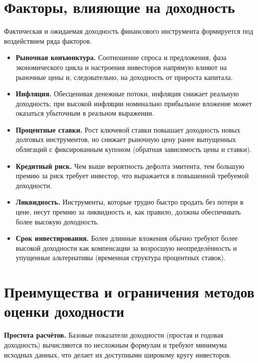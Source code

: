 \documentclass[14pt, a4paper]{extarticle}
\begin{document}
\section{Факторы, влияющие на доходность}

Фактическая и ожидаемая доходность финансового инструмента формируется под
воздействием ряда факторов.

\begin{itemize}
  \item \textbf{Рыночная конъюнктура.} Соотношение спроса и предложения,
        фаза экономического цикла и настроения инвесторов напрямую влияют на
        рыночные цены и, следовательно, на доходность от прироста капитала.
  \item \textbf{Инфляция.} Обесценивая денежные потоки, инфляция снижает
        реальную доходность; при высокой инфляции номинально прибыльное
        вложение может оказаться убыточным в реальном выражении.
  \item \textbf{Процентные ставки.} Рост ключевой ставки повышает доходность
        новых долговых инструментов, но снижает рыночную цену ранее выпущенных
        облигаций с фиксированным купоном (обратная зависимость цены и ставки).
  \item \textbf{Кредитный риск.} Чем выше вероятность дефолта эмитента, тем
        большую премию за риск требует инвестор, что выражается в повышенной
        требуемой доходности.
  \item \textbf{Ликвидность.} Инструменты, которые трудно быстро продать без
        потери в цене, несут премию за ликвидность и, как правило, должны
        обеспечивать более высокую доходность.
  \item \textbf{Срок инвестирования.} Более длинные вложения обычно требуют
        более высокой доходности как компенсации за возросшую неопределённость
        и упущенные альтернативы (временная структура процентных ставок).
\end{itemize}

\section{Преимущества и ограничения методов оценки доходности}

\textbf{Простота расчётов.} Базовые показатели доходности (простая и годовая
доходность) вычисляются по несложным формулам и требуют минимума исходных
данных, что делает их доступными широкому кругу инвесторов.
\end{document}
